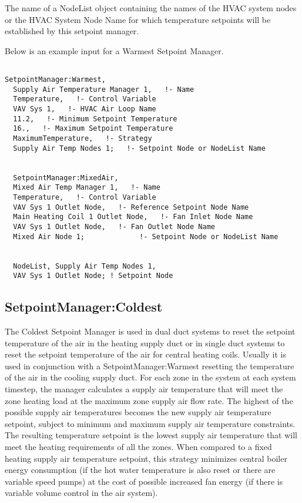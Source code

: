 The name of a NodeList object containing the names of the HVAC system nodes or the HVAC System Node Name for which temperature setpoints will be established by this setpoint manager.

Below is an example input for a Warmest Setpoint Manager.

\begin{lstlisting}

SetpointManager:Warmest,
  Supply Air Temperature Manager 1,   !- Name
  Temperature,   !- Control Variable
  VAV Sys 1,   !- HVAC Air Loop Name
  11.2,   !- Minimum Setpoint Temperature
  16.,   !- Maximum Setpoint Temperature
  MaximumTemperature,   !- Strategy
  Supply Air Temp Nodes 1;   !- Setpoint Node or NodeList Name


  SetpointManager:MixedAir,
  Mixed Air Temp Manager 1,   !- Name
  Temperature,   !- Control Variable
  VAV Sys 1 Outlet Node,   !- Reference Setpoint Node Name
  Main Heating Coil 1 Outlet Node,   !- Fan Inlet Node Name
  VAV Sys 1 Outlet Node,   !- Fan Outlet Node Name
  Mixed Air Node 1;             !- Setpoint Node or NodeList Name


  NodeList, Supply Air Temp Nodes 1,
  VAV Sys 1 Outlet Node; ! Setpoint Node
\end{lstlisting}

\subsection{SetpointManager:Coldest}\label{setpointmanagercoldest}

The Coldest Setpoint Manager is used in dual duct systems to reset the setpoint temperature of the air in the heating supply duct or in single duct systems to reset the setpoint temperature of the air for central heating coils. Usually it is used in conjunction with a SetpointManager:Warmest resetting the temperature of the air in the cooling supply duct. For each zone in the system at each system timestep, the manager calculates a supply air temperature that will meet the zone heating load at the maximum zone supply air flow rate. The highest of the possible supply air temperatures becomes the new supply air temperature setpoint, subject to minimum and maximum supply air temperature constraints. The resulting temperature setpoint is the lowest supply air temperature that will meet the heating requirements of all the zones. When compared to a fixed heating supply air temperature setpoint, this strategy minimizes central boiler energy consumption (if the hot water temperature is also reset or there are variable speed pumps) at the cost of possible increased fan energy (if there is variable volume control in the air system).

